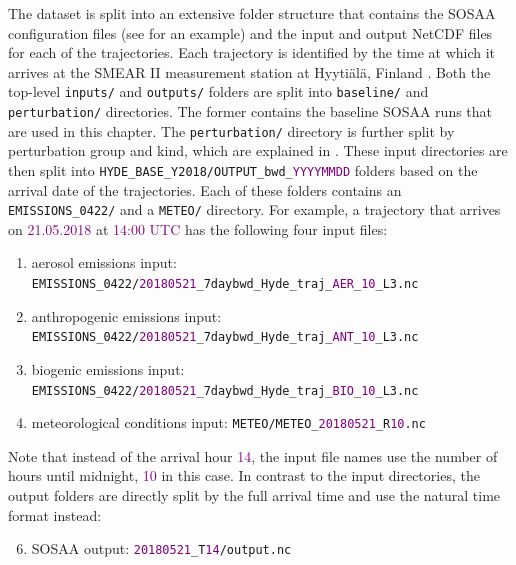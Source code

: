 The dataset is split into an extensive folder structure that contains the SOSAA configuration files (see  for an example) and the input and output NetCDF files \cite{netcdf-1989} for each of the trajectories. Each trajectory is identified by the time at which it arrives at the SMEAR II measurement station at Hyyti\"al\"a, Finland \cite{smear-station-2013}. Both the top-level \texttt{inputs/} and \texttt{outputs/} folders are split into \texttt{baseline/} and \texttt{perturbation/} directories. The former contains the baseline SOSAA runs that are used in this chapter. The \texttt{perturbation/} directory is further split by perturbation group and kind, which are explained in . These input directories are then split into \texttt{HYDE\_BASE\_Y2018/OUTPUT\_bwd\_\textcolor{purple}{YYYYMMDD}} folders based on the arrival date of the trajectories. Each of these folders contains an \texttt{EMISSIONS\_0422/} and a \texttt{METEO/} directory. For example, a trajectory that arrives on \textcolor{purple}{21.05.2018} at \textcolor{purple}{14:00 UTC} has the following four input files:
\begin{enumerate}
    \item aerosol emissions input: \texttt{EMISSIONS\_0422/\textcolor{purple}{20180521}\_7daybwd\_Hyde\_traj\_\textcolor{purple}{AER}\_\textcolor{purple}{10}\_L3.nc}
    \item anthropogenic emissions input: \texttt{EMISSIONS\_0422/\textcolor{purple}{20180521}\_7daybwd\_Hyde\_traj\_\textcolor{purple}{ANT}\_\textcolor{purple}{10}\_L3.nc}
    \item biogenic emissions input: \texttt{EMISSIONS\_0422/\textcolor{purple}{20180521}\_7daybwd\_Hyde\_traj\_\textcolor{purple}{BIO}\_\textcolor{purple}{10}\_L3.nc}
    \item meteorological conditions input: \texttt{METEO/METEO\_\textcolor{purple}{20180521}\_R\textcolor{purple}{10}.nc}
\end{enumerate}
Note that instead of the arrival hour \textcolor{purple}{14}, the input file names use the number of hours until midnight, \textcolor{purple}{10} in this case. In contrast to the input directories, the output folders are directly split by the full arrival time and use the natural time format instead:
\begin{enumerate}
    \setcounter{enumi}{5}
    \item SOSAA output: \texttt{\textcolor{purple}{20180521}\_T\textcolor{purple}{14}/output.nc}
\end{enumerate}
